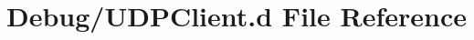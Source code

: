 \hypertarget{Debug_2UDPClient_8d}{}\section{Debug/\+U\+D\+P\+Client.d File Reference}
\label{Debug_2UDPClient_8d}

